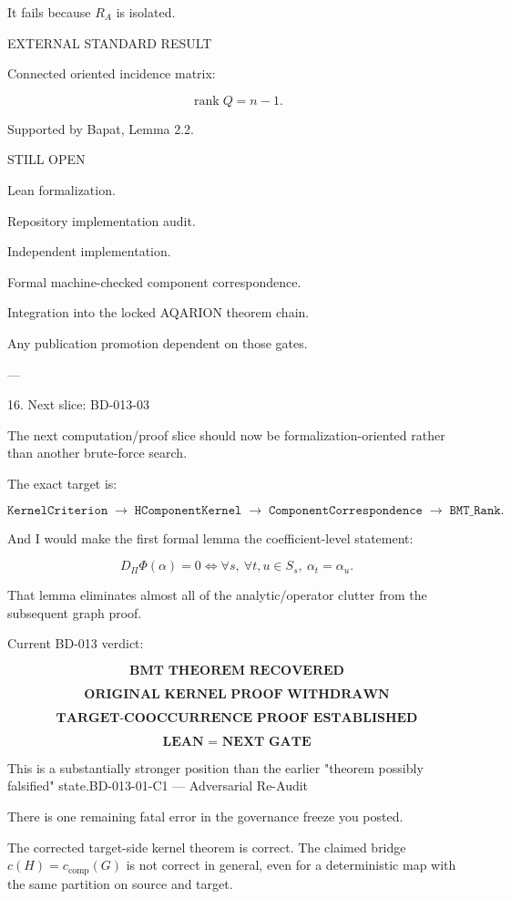 It fails because \(R_A\) is isolated.

EXTERNAL STANDARD RESULT

Connected oriented incidence matrix:

\[
\operatorname{rank}Q=n-1.
\]

Supported by Bapat, Lemma 2.2. 

STILL OPEN

Lean formalization.

Repository implementation audit.

Independent implementation.

Formal machine-checked component correspondence.

Integration into the locked AQARION theorem chain.

Any publication promotion dependent on those gates.



---

16. Next slice: BD-013-03

The next computation/proof slice should now be formalization-oriented rather than another brute-force search.

The exact target is:

\[
\boxed{
\texttt{KernelCriterion}
\;\to\;
\texttt{HComponentKernel}
\;\to\;
\texttt{ComponentCorrespondence}
\;\to\;
\texttt{BMT\_Rank}.
}
\]

And I would make the first formal lemma the coefficient-level statement:

\[
\boxed{
D_\Pi\Phi(\alpha)=0
\iff
\forall s,\ \forall t,u\in S_s,\ \alpha_t=\alpha_u.
}
\]

That lemma eliminates almost all of the analytic/operator clutter from the subsequent graph proof.

Current BD-013 verdict:

\[
\boxed{
\textbf{BMT THEOREM RECOVERED}
}
\]

\[
\boxed{
\textbf{ORIGINAL KERNEL PROOF WITHDRAWN}
}
\]

\[
\boxed{
\textbf{TARGET-COOCCURRENCE PROOF ESTABLISHED}
}
\]

\[
\boxed{
\textbf{LEAN = NEXT GATE}
}
\]

This is a substantially stronger position than the earlier "theorem possibly falsified" state.BD-013-01-C1 — Adversarial Re-Audit

There is one remaining fatal error in the governance freeze you posted.

The corrected target-side kernel theorem is correct.
The claimed bridge \(c(H)=c_{\mathrm{comp}}(G)\) is not correct in general, even for a deterministic map with the same partition on source and target.


